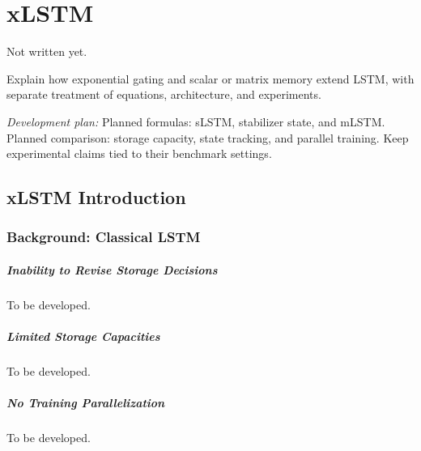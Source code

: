 \documentclass[11pt, oneside]{book}
\let\originalsection\section
\renewcommand{\section}{\Needspace{7\baselineskip}\originalsection}
\let\originalsubsection\subsection
\renewcommand{\subsection}{\Needspace{6\baselineskip}\originalsubsection}
\begin{document}
\chapter{xLSTM}\label{ch:source-8}

{\small\color{gray!70!black} Not written yet.}

Explain how exponential gating and scalar or matrix memory extend LSTM, with separate treatment of equations, architecture, and experiments.

\textit{Development plan:} Planned formulas: sLSTM, stabilizer state, and mLSTM. Planned comparison: storage capacity, state tracking, and parallel training. Keep experimental claims tied to their benchmark settings.

\section{xLSTM Introduction}\label{sec:source-8-1}

\subsection{Background: Classical LSTM}\label{sec:source-8-1-1}

\paragraph{Inability to Revise Storage Decisions}\label{sec:source-8-1-1-1}
{\small\color{gray!70!black} To be developed.}

\paragraph{Limited Storage Capacities}\label{sec:source-8-1-1-2}
{\small\color{gray!70!black} To be developed.}

\paragraph{No Training Parallelization}\label{sec:source-8-1-1-3}
{\small\color{gray!70!black} To be developed.}
\end{document}

